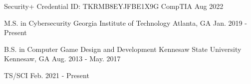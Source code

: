 \documentclass[11pt, a4paper]{awesome-cv}
\begin{document}




\begin{cvhonors}

  \cvhonor
    {Security+} %
    {Credential ID: TKRMB8EYJFBE1X9G} %
    {CompTIA} %
    {Aug 2022} %

\end{cvhonors}



\begin{cventries}

  \cventry
    {M.S. in Cybersecurity} %
    {Georgia Institute of Technology} %
    {Atlanta, GA} %
    {Jan. 2019 - Present} %
    {
    }

  \cventry
    {B.S. in Computer Game Design and Development} %
    {Kennesaw State University} %
    {Kennesaw, GA} %
    {Aug. 2013 - May. 2017} %
    {
    }

\end{cventries}


\begin{cvclearances}
    
  \cvclearance
    {TS/SCI} %
    {Feb. 2021 - Present} %

\end{cvclearances}


\end{document}
